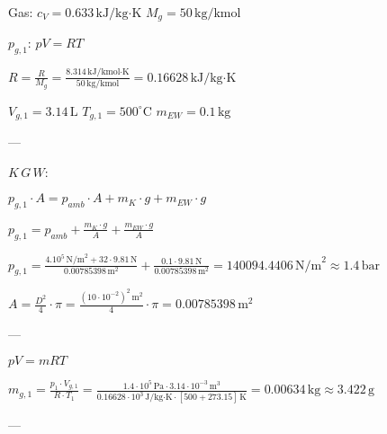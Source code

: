Gas: \( c_V = 0.633 \, \text{kJ/kg·K} \)  
\( M_g = 50 \, \text{kg/kmol} \)  

\( p_{g,1} \): \( pV = RT \)  

\( R = \frac{R}{M_g} = \frac{8.314 \, \text{kJ/kmol·K}}{50 \, \text{kg/kmol}} = 0.16628 \, \text{kJ/kg·K} \)  

\( V_{g,1} = 3.14 \, \text{L} \)  
\( T_{g,1} = 500^\circ \text{C} \)  
\( m_{EW} = 0.1 \, \text{kg} \)  

---

\( K \, G \, W \):  

\( p_{g,1} \cdot A = p_{amb} \cdot A + m_K \cdot g + m_{EW} \cdot g \)  

\( p_{g,1} = p_{amb} + \frac{m_K \cdot g}{A} + \frac{m_{EW} \cdot g}{A} \)  

\( p_{g,1} = \frac{4.10^5 \, \text{N/m}^2 + 32 \cdot 9.81 \, \text{N}}{0.00785398 \, \text{m}^2} + \frac{0.1 \cdot 9.81 \, \text{N}}{0.00785398 \, \text{m}^2} = 140094.4406 \, \text{N/m}^2 \approx 1.4 \, \text{bar} \)  

\( A = \frac{D^2}{4} \cdot \pi = \frac{(10 \cdot 10^{-2})^2 \, \text{m}^2}{4} \cdot \pi = 0.00785398 \, \text{m}^2 \)  

---

\( pV = mRT \)  

\( m_{g,1} = \frac{p_1 \cdot V_{g,1}}{R \cdot T_1} = \frac{1.4 \cdot 10^5 \, \text{Pa} \cdot 3.14 \cdot 10^{-3} \, \text{m}^3}{0.16628 \cdot 10^3 \, \text{J/kg·K} \cdot [500 + 273.15] \, \text{K}} = 0.00634 \, \text{kg} \approx 3.422 \, \text{g} \)  

---